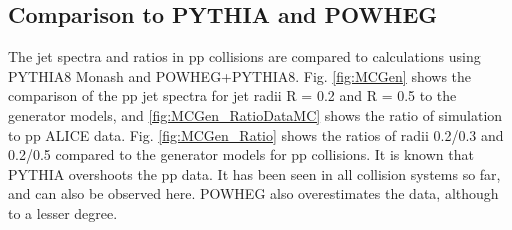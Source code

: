 \documentclass[ALICE]{ALICE_analysis_notes}
\newcommand{\pp}{pp\xspace}
\begin{document}
\subsection{Comparison to PYTHIA and POWHEG}
\label{sec:mcComparison}

The jet spectra and ratios in \pp collisions are compared to calculations using PYTHIA8 Monash and POWHEG+PYTHIA8. Fig. \ref{fig:MCGen} shows the comparison of the \pp jet spectra for jet radii R = 0.2 and R = 0.5 to the generator models, and \ref{fig:MCGen_RatioDataMC} shows the ratio of simulation to \pp ALICE data. Fig. \ref{fig:MCGen_Ratio} shows the ratios of radii 0.2/0.3 and 0.2/0.5 compared to the generator models for \pp collisions. It is known that PYTHIA overshoots the \pp data. It has been seen in all collision systems so far, and can also be observed here. POWHEG also overestimates the data, although to a lesser degree.
\end{document}

